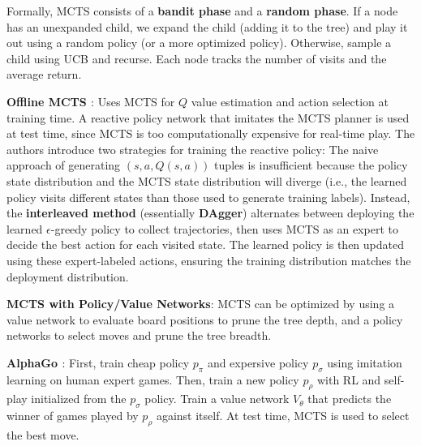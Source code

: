 \documentclass{article}
\begin{document}
  Formally, MCTS consists of a \textbf{bandit phase} and a \textbf{random phase}. If a node has an unexpanded child, we expand the child (adding it to the tree) and play it out using a random policy (or a more optimized policy). Otherwise, sample a child using UCB and recurse. Each node tracks the number of visits and the average return. 

  \textbf{Offline MCTS \cite{guo2014deep}}: Uses MCTS for $Q$ value estimation and action selection at training time. A reactive policy network that imitates the MCTS planner is used at test time, since MCTS is too computationally expensive for real-time play. The authors introduce two strategies for training the reactive policy:
  The naive approach of generating $(s,a,Q(s,a))$ tuples is insufficient because the policy state distribution and the MCTS state distribution will diverge (i.e., the learned policy visits different states than those used to generate training labels). Instead, the \textbf{interleaved method} (essentially \textbf{DAgger}) alternates between deploying the learned $\epsilon$-greedy policy to collect trajectories, then uses MCTS as an expert to decide the best action for each visited state. The learned policy is then updated using these expert-labeled actions, ensuring the training distribution matches the deployment distribution.

  \textbf{MCTS with Policy/Value Networks}: MCTS can be optimized by using a value network to evaluate board positions to prune the tree depth, and a policy networks to select moves and prune the tree breadth.

  \textbf{AlphaGo \cite{silver2016mastering}}: First, train cheap policy $p_\pi$ and expersive policy $p_\sigma$ using imitation learning on human expert games. Then, train a new policy $p_\rho$ with RL and self-play initialized from the $p_\sigma$ policy. Train a value network $V_\theta$ that predicts the winner of games played by $p_\rho$ against itself. At test time, MCTS is used to select the best move. 
\end{document}
